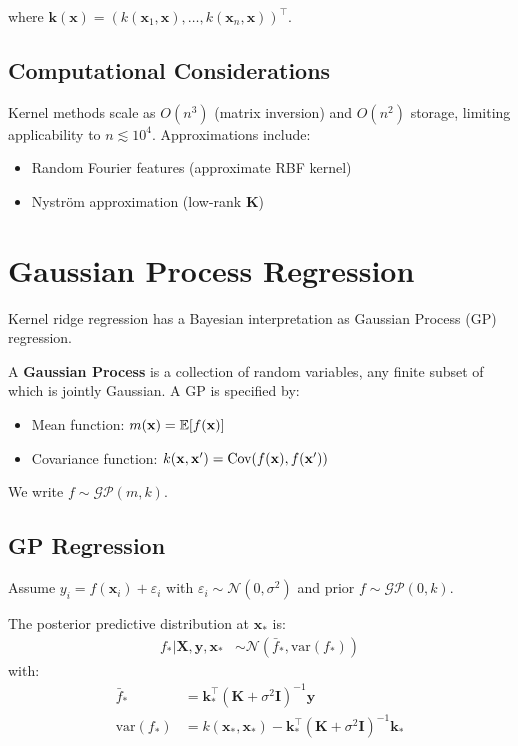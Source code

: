 \documentclass[main.tex]{subfiles}
\begin{document}
where $\mathbf{k}(\mathbf{x}) = (k(\mathbf{x}_1, \mathbf{x}), \ldots, k(\mathbf{x}_n, \mathbf{x}))^\top$.

\subsection{Computational Considerations}

Kernel methods scale as $O(n^3)$ (matrix inversion) and $O(n^2)$ storage, limiting applicability to $n \lesssim 10^4$. Approximations include:
\begin{itemize}
    \item Random Fourier features (approximate RBF kernel)
    \item Nyström approximation (low-rank $\mathbf{K}$)
\end{itemize}

\needspace{0.33\textheight}
\section{Gaussian Process Regression}

Kernel ridge regression has a Bayesian interpretation as Gaussian Process (GP) regression.

\begin{definition}
A \textbf{Gaussian Process} is a collection of random variables, any finite subset of which is jointly Gaussian. A GP is specified by:
\begin{itemize}
    \item Mean function: $m(\mathbf{x}) = \mathbb{E}[f(\mathbf{x})]$
    \item Covariance function: $k(\mathbf{x}, \mathbf{x}') = \text{Cov}(f(\mathbf{x}), f(\mathbf{x}'))$
\end{itemize}
\end{definition}

We write $f \sim \mathcal{GP}(m, k)$.

\subsection{GP Regression}

Assume $y_i = f(\mathbf{x}_i) + \varepsilon_i$ with $\varepsilon_i \sim \mathcal{N}(0, \sigma^2)$ and prior $f \sim \mathcal{GP}(0, k)$.

The posterior predictive distribution at $\mathbf{x}_*$ is:
\begin{align}
f_* | \mathbf{X}, \mathbf{y}, \mathbf{x}_* &\sim \mathcal{N}(\bar{f}_*, \text{var}(f_*))
\end{align}
with:
\begin{align}
\bar{f}_* &= \mathbf{k}_*^\top(\mathbf{K} + \sigma^2\mathbf{I})^{-1}\mathbf{y} \\
\text{var}(f_*) &= k(\mathbf{x}_*, \mathbf{x}_*) - \mathbf{k}_*^\top(\mathbf{K} + \sigma^2\mathbf{I})^{-1}\mathbf{k}_*
\end{align}
\end{document}
